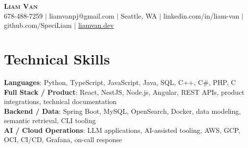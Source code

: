 \documentclass[letterpaper,11pt]{article}
\begin{document}

%
\begin{center}
    \textbf{\Huge \scshape Liam Van} \\ \vspace{1pt}
    \small 678-488-7259 $|$ \small {liamvanpj@gmail.com} $|$ Seattle, WA
 {{$|$ linkedin.com/in/liam-van} {$|$ github.com/SpeciLiam} {$|$ \href{https://liamvan.dev}{liamvan.dev}}}

\end{center}

\section{Technical Skills}
 \begin{itemize}[leftmargin=0.15in, label={}]
    \small{\item{
     \textbf{Languages}{: Python, TypeScript, JavaScript, Java, SQL, C++, C\#, PHP, C} \\
     \textbf{Full Stack / Product}{: React, NestJS, Node.js, Angular, REST APIs, product integrations, technical documentation} \\
     \textbf{Backend / Data}{: Spring Boot, MySQL, OpenSearch, Docker, data modeling, semantic retrieval, CLI tooling} \\
     \textbf{AI / Cloud Operations}{: LLM applications, AI-assisted tooling, AWS, GCP, OCI, CI/CD, Grafana, on-call response} \\
    }}
 \end{itemize}
%

\end{document}
